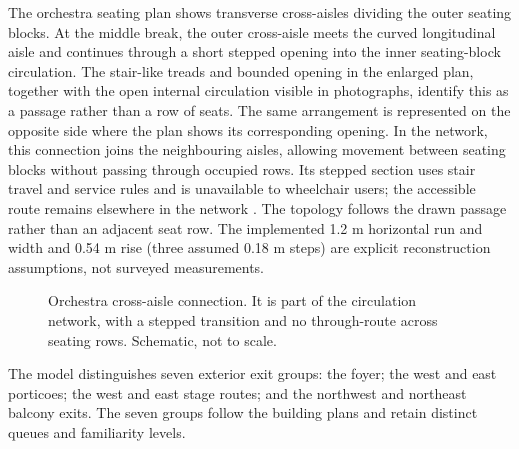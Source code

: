 \documentclass[11pt,a4paper]{article}
\begin{document}
The orchestra seating plan shows transverse cross-aisles dividing the outer seating blocks. At the middle break, the outer cross-aisle meets the curved longitudinal aisle and continues through a short stepped opening into the inner seating-block circulation. The stair-like treads and bounded opening in the enlarged plan, together with the open internal circulation visible in photographs, identify this as a passage rather than a row of seats. The same arrangement is represented on the opposite side where the plan shows its corresponding opening. In the network, this connection joins the neighbouring aisles, allowing movement between seating blocks without passing through occupied rows. Its stepped section uses stair travel and service rules and is unavailable to wheelchair users; the accessible route remains elsewhere in the network \cite{brief}. The topology follows the drawn passage rather than an adjacent seat row. The implemented 1.2 m horizontal run and width and 0.54 m rise (three assumed 0.18 m steps) are explicit reconstruction assumptions, not surveyed measurements.

\begin{figure}[htbp]
\centering
{}
\caption{Orchestra cross-aisle connection. It is part of the circulation network, with a stepped transition and no through-route across seating rows. Schematic, not to scale.}
\label{fig:crossaisle}
\end{figure}

The model distinguishes seven exterior exit groups: the foyer; the west and east porticoes; the west and east stage routes; and the northwest and northeast balcony exits. The seven groups follow the building plans \cite{brief} and retain distinct queues and familiarity levels.
\end{document}
